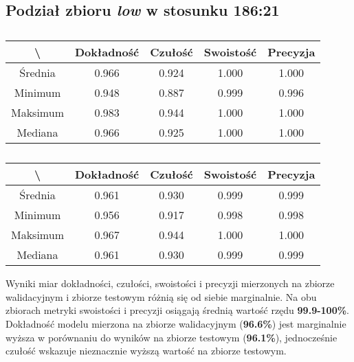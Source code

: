 \subsection{Podział zbioru \textit{low} w stosunku 186:21}


\begin{table}[H]
	\centering
	\caption{}
	\vspace{6pt}
	{\footnotesize
		\begin{tabular}{|c|c|c|c|c|}
      \hline \textbackslash & Dokładność & Czułość & Swoistość & Precyzja \\
      \hline Średnia & 0.966 & 0.924 & 1.000 & 1.000 \\
      \hline Minimum & 0.948 & 0.887 & 0.999 & 0.996 \\
      \hline Maksimum & 0.983 & 0.944 & 1.000 & 1.000 \\
      \hline Mediana & 0.966 & 0.925 & 1.000 & 1.000 \\
      \hline
    \end{tabular}
    \label{Tab:lowsplitb_val}
	}
	\vspace{0pt}
\end{table}

\begin{table}[H]
	\centering
	\caption{}
	\vspace{6pt}
	{\footnotesize
		\begin{tabular}{|c|c|c|c|c|}
      \hline \textbackslash & Dokładność & Czułość & Swoistość & Precyzja \\
      \hline Średnia & 0.961 & 0.930 & 0.999 & 0.999 \\
      \hline Minimum & 0.956 & 0.917 & 0.998 & 0.998 \\
      \hline Maksimum & 0.967 & 0.944 & 1.000 & 1.000 \\
      \hline Mediana & 0.961 & 0.930 & 0.999 & 0.999 \\
      \hline
    \end{tabular}
    \label{Tab:lowsplitb_test}
	}
	\vspace{0pt}
\end{table}

Wyniki miar dokładności, czułości, swoistości i precyzji mierzonych na zbiorze walidacyjnym i zbiorze testowym różnią się od siebie marginalnie.
Na obu zbiorach metryki swoistości i precyzji osiągają średnią wartość rzędu \textbf{99.9-100\%}.
Dokładność modelu mierzona na zbiorze walidacyjnym (\textbf{96.6\%}) jest marginalnie wyższa w porównaniu do wyników na zbiorze testowym (\textbf{96.1\%}), jednocześnie czułość wskazuje nieznacznie wyższą wartość na zbiorze testowym.
